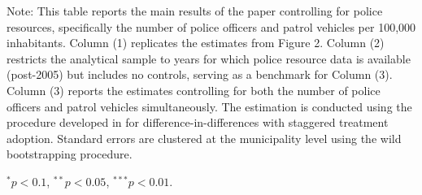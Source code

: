 \begin{table}[H]
\begin{threeparttable}
\begin{tablenotes}[flushleft]
\item \footnotesize{Note: This table reports the main results of the paper controlling
for police resources, specifically the number of police officers and patrol
vehicles per 100,000 inhabitants. Column (1) replicates the estimates from
Figure 2. Column (2) restricts the analytical sample to years for which police
resource data is available (post-2005) but includes no controls, serving as a
benchmark for Column (3). Column (3) reports the estimates controlling for both
the number of police officers and patrol vehicles simultaneously. The estimation is conducted using the procedure developed in \citet{Callaway}
for difference-in-differences with staggered treatment adoption. Standard errors
are clustered at the municipality level using the wild bootstrapping procedure.} \\
\item \footnotesize{$^{*}p<0.1$, $^{**}p<0.05$, $^{***}p<0.01$.}
\end{tablenotes}
\end{threeparttable}
\end{table}
